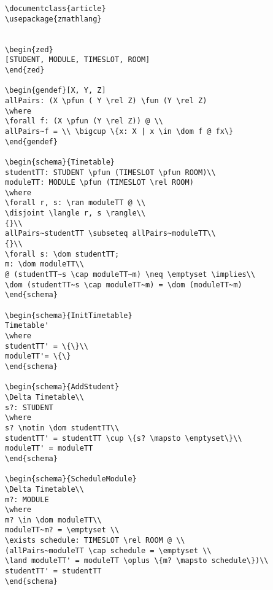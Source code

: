 \begin{verbatim}
\documentclass{article}
\usepackage{zmathlang}


\begin{zed}
[STUDENT, MODULE, TIMESLOT, ROOM]
\end{zed}

\begin{gendef}[X, Y, Z]
allPairs: (X \pfun ( Y \rel Z) \fun (Y \rel Z)
\where
\forall f: (X \pfun (Y \rel Z)) @ \\
allPairs~f = \\ \bigcup \{x: X | x \in \dom f @ fx\}
\end{gendef}

\begin{schema}{Timetable}
studentTT: STUDENT \pfun (TIMESLOT \pfun ROOM)\\
moduleTT: MODULE \pfun (TIMESLOT \rel ROOM)
\where
\forall r, s: \ran moduleTT @ \\
\disjoint \langle r, s \rangle\\
{}\\
allPairs~studentTT \subseteq allPairs~moduleTT\\
{}\\
\forall s: \dom studentTT; 
m: \dom moduleTT\\
@ (studentTT~s \cap moduleTT~m) \neq \emptyset \implies\\
\dom (studentTT~s \cap moduleTT~m) = \dom (moduleTT~m)
\end{schema}

\begin{schema}{InitTimetable}
Timetable'
\where
studentTT' = \{\}\\
moduleTT'= \{\}
\end{schema}

\begin{schema}{AddStudent}
\Delta Timetable\\
s?: STUDENT
\where
s? \notin \dom studentTT\\
studentTT' = studentTT \cup \{s? \mapsto \emptyset\}\\
moduleTT' = moduleTT
\end{schema}

\begin{schema}{ScheduleModule}
\Delta Timetable\\
m?: MODULE
\where
m? \in \dom moduleTT\\
moduleTT~m? = \emptyset \\
\exists schedule: TIMESLOT \rel ROOM @ \\
(allPairs~moduleTT \cap schedule = \emptyset \\
\land moduleTT' = moduleTT \oplus \{m? \mapsto schedule\})\\
studentTT' = studentTT
\end{schema}


\end{verbatim}
